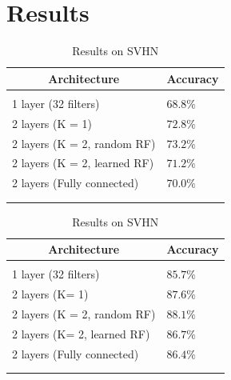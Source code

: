 \documentclass{article} %
\begin{document}


\section{Results}
\label{sec-results}

\begin {table}
\parbox{.5\linewidth}{
\caption{Results on CIFAR-10}
\label{tab:results-cifar10}
\begin{center}
\begin{tabular}{ll}
\multicolumn{1}{c}{\bf Architecture}  &\multicolumn{1}{c}{\bf Accuracy}
\\ \hline \\
1 layer (32 filters)			& $68.8\%$\\
2 layers (K = 1)				&$72.8\%$ \\
2 layers (K = 2, random RF)	&$73.2\%$ \\
2 layers (K = 2, learned RF)	&$71.2\%$\\
2 layers (Fully connected)		&$70.0\%$\\
\\ \hline \\
\end{tabular}
\end{center}
}
\parbox{.5\linewidth}{
\caption{Results on SVHN}
\label{tab:results-svhn}
\begin{center}
\begin{tabular}{ll}
\multicolumn{1}{c}{\bf Architecture}  &\multicolumn{1}{c}{\bf Accuracy}
\\ \hline \\
1 layer (32 filters)			& $85.7\%$\\
2 layers (K= 1)                           &$87.6\%$ \\
2 layers (K = 2, random RF)	&$88.1\%$ \\
2 layers (K= 2, learned RF)	&$86.7\%$\\
2 layers (Fully connected)		&$86.4\%$\\
\\ \hline \\
\end{tabular}
\end{center}
}
\end{table}
\end{document}
